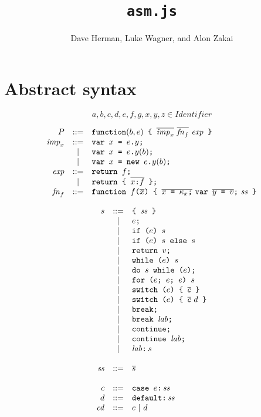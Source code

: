 \documentclass{article}
\newcommand{\seq}[1]{\overline{{#1}}}
\newcommand{\mathjs}[1]{\mbox{\texttt{{#1}}}}
\newcommand{\return}[1]{\mathjs{return }{#1}\mathjs{;}}
\newcommand{\fun}[3]{\mathjs{function }{#1}\mathjs{(}{#2}\mathjs{) \{ }{#3}\mathjs{ \}}}
\newcommand{\var}[1]{\mathjs{var }{#1}\mathjs{;}}
\newcommand{\while}[2]{\mathjs{while (}{#1}\mathjs{) }{#2}}
\newcommand{\dowhile}[2]{\mathjs{do }{#1}\mathjs{ while (}{#2}\mathjs{);}}
\newcommand{\for}[4]{\mathjs{for (}{#1}\mathjs{; }{#2}\mathjs{; }{#3}\mathjs{) }{#4}}
\newcommand{\switch}[2]{\mathjs{switch (}{#1}\mathjs{) \{ }{#2}\mathjs{ \}}}
\newcommand{\brk}{\mathjs{break;}}
\newcommand{\brkl}[1]{\mathjs{break }{#1}\mathjs{;}}
\newcommand{\cont}{\mathjs{continue;}}
\newcommand{\contl}[1]{\mathjs{continue }{#1}\mathjs{;}}
\newcommand{\lab}[2]{{#1}\mathjs{:}\,{#2}}
\newcommand{\ifthen}[2]{\mathjs{if (}{#1}\mathjs{) }{#2}}
\newcommand{\ifthenelse}[3]{\mathjs{if (}{#1}\mathjs{) }{#2}\mathjs{ else }{#3}}
\newcommand{\block}[1]{\mathjs{\{ }{#1}\mathjs{ \}}}
\newcommand{\function}{\mathtt{function}}
\begin{document}
\title{\texttt{asm.js}}
\author{Dave Herman, Luke Wagner, and Alon Zakai}
\maketitle

\section{Abstract syntax}

\[
a, b, c, d, e, f, g, x, y, z \in \mathit{Identifier}
\]

\[
\begin{array}{rcl}
P               & ::= & \function(b, e)\mathjs{ \{ } \seq{\mathit{imp}_x}\ \seq{\mathit{fn}_f}\ \mathit{exp}\mathjs{ \}} \\
\mathit{imp}_x  & ::= & \var{x \mathjs{ = } e\mathjs{.}y} \\
                &  |  & \var{x \mathjs{ = } e\mathjs{.}y(b)} \\
                &  |  & \var{x \mathjs{ = } \mathjs{new }e\mathjs{.}y(b)} \\
\mathit{exp}    & ::= & \return{f} \\
                &  |  & \return{\mathjs{\{ } \seq{x \mathjs{:} f} \mathjs{ \}}} \\
\mathit{fn}_f   & ::= & \fun{f}{\seq{x}}{\seq{x\mathjs{ = }\kappa_x\mathjs{;}}\ \var{\seq{y\mathjs{ = }v}}\ \mathit{ss}} \\
\end{array}
\]

\[
\begin{array}{rcl}
s & ::= & \block{\mathit{ss}} \\
  &  |  & e\mathjs{;} \\
  &  |  & \ifthen{e}{s} \\
  &  |  & \ifthenelse{e}{s}{s} \\
  &  |  & \return{v} \\
  &  |  & \while{e}{s} \\
  &  |  & \dowhile{s}{e} \\
  &  |  & \for{e}{e}{e}{s} \\
  &  |  & \switch{e}{\seq{c}} \\
  &  |  & \switch{e}{\seq{c}\ d} \\
  &  |  & \brk \\
  &  |  & \brkl{\mathit{lab}} \\
  &  |  & \cont \\
  &  |  & \contl{\mathit{lab}} \\
  &  |  & \lab{\mathit{lab}}{s} \\
\\
\mathit{ss} & ::= & \seq{s} \\
\\
c & ::= & \mathjs{case }e\mathjs{:}\,\mathit{ss} \\
d & ::= & \mathjs{default:}\,\mathit{ss} \\
\mathit{cd} & ::= & c ~|~ d \\
\end{array}
\]
\end{document}
